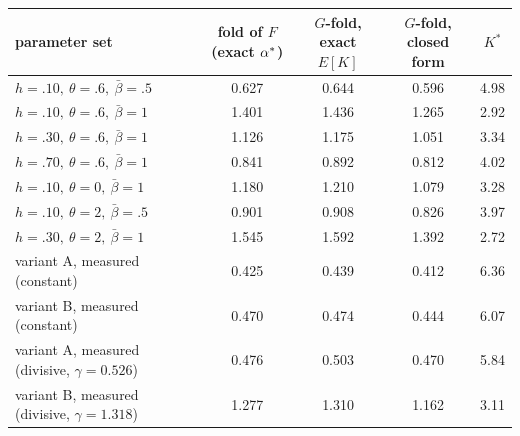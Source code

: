 \begin{tabular}{lcccc}
\toprule
parameter set & fold of $F$ (exact $\alpha^{*}$) & $G$-fold, exact $E[K]$ & $G$-fold, closed form & $K^*$ \\
\midrule
$h{=}.10,\ \theta{=}.6,\ \bar\beta{=}.5$ & 0.627 & 0.644 & 0.596 & 4.98 \\
$h{=}.10,\ \theta{=}.6,\ \bar\beta{=}1$ & 1.401 & 1.436 & 1.265 & 2.92 \\
$h{=}.30,\ \theta{=}.6,\ \bar\beta{=}1$ & 1.126 & 1.175 & 1.051 & 3.34 \\
$h{=}.70,\ \theta{=}.6,\ \bar\beta{=}1$ & 0.841 & 0.892 & 0.812 & 4.02 \\
$h{=}.10,\ \theta{=}0,\ \bar\beta{=}1$ & 1.180 & 1.210 & 1.079 & 3.28 \\
$h{=}.10,\ \theta{=}2,\ \bar\beta{=}.5$ & 0.901 & 0.908 & 0.826 & 3.97 \\
$h{=}.30,\ \theta{=}2,\ \bar\beta{=}1$ & 1.545 & 1.592 & 1.392 & 2.72 \\
variant A, measured (constant) & 0.425 & 0.439 & 0.412 & 6.36 \\
variant B, measured (constant) & 0.470 & 0.474 & 0.444 & 6.07 \\
variant A, measured (divisive, $\gamma{=}0.526$) & 0.476 & 0.503 & 0.470 & 5.84 \\
variant B, measured (divisive, $\gamma{=}1.318$) & 1.277 & 1.310 & 1.162 & 3.11 \\
\bottomrule
\end{tabular}
